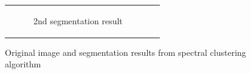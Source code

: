 \documentclass[a4paper]{article}
\begin{document}
\begin{figure}[h!]
{\begin{tabular}{c@{}c}
\begin{subfigure}[t]{.35\columnwidth}
        \caption{{\small 2nd segmentation result}}
        \label{fig:mean and std of net44}
    \end{subfigure}
    \end{tabular}}
    \caption{{\small Original image and segmentation results from spectral clustering algorithm}}
    \label{fig:mean and std of nets}
\end{figure}
\end{document}
